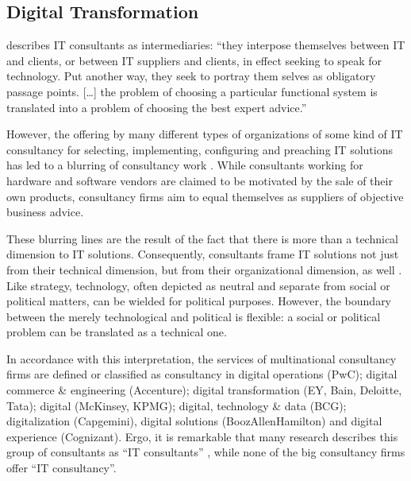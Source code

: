 \documentclass[12pt]{article}
\begin{document}
\hypertarget{digital-transformation}{%
\subsection{Digital Transformation}\label{digital-transformation}}

\citet[28]{bloomfield1995} describes IT consultants as intermediaries:
``they interpose themselves between IT and clients, or between IT
suppliers and clients, in effect seeking to speak for technology. Put
another way, they seek to portray them selves as obligatory passage
points. {[}\ldots{]} the problem of choosing a particular functional
system is translated into a problem of choosing the best expert
advice.''

However, the offering by many different types of organizations of some
kind of IT consultancy for selecting, implementing, configuring and
preaching IT solutions has led to a blurring of consultancy work
\citetext{\citealp[ 31]{bloomfield1995}; \citealp[ 162]{kipping2012}}.
While consultants working for hardware and software vendors are claimed
to be motivated by the sale of their own products, consultancy firms aim
to equal themselves as suppliers of objective business advice.

These blurring lines are the result of the fact that there is more than
a technical dimension to IT solutions. Consequently, consultants frame
IT solutions not just from their technical dimension, but from their
organizational dimension, as well \citep[ 24-25]{bloomfield1995}. Like
strategy, technology, often depicted as neutral and separate from social
or political matters, can be wielded for political purposes. However,
the boundary between the merely technological and political is flexible:
a social or political problem can be translated as a technical one.

In accordance with this interpretation, the services of multinational
consultancy firms are defined or classified as consultancy in digital
operations (PwC); digital commerce \& engineering (Accenture); digital
transformation (EY, Bain, Deloitte, Tata); digital (McKinsey, KPMG);
digital, technology \& data (BCG); digitalization (Capgemini), digital
solutions (BoozAllenHamilton) and digital experience (Cognizant). Ergo,
it is remarkable that many research describes this group of consultants
as ``IT consultants''
\citep{nevo2007, loh1992, fincham2006, armbruster2006, bloomfield1995, schwarz2005},
while none of the big consultancy firms offer ``IT consultancy''.
\end{document}

